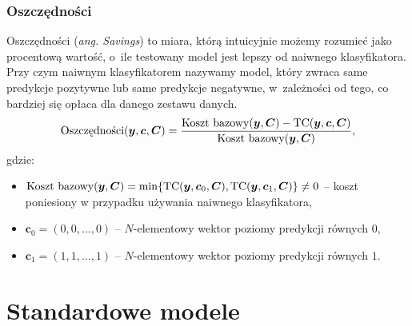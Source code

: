 \documentclass[inzynierska]{pwr_wmat_praca_dyplomowa}
\theoremstyle{plain}
\numberwithin{theorem}{chapter}
\theoremstyle{definition}
\numberwithin{theorem}{chapter}
\begin{document}
\subsubsection{Oszczędności}
Oszczędności (\textit{ang. Savings}) to miara, którą intuicyjnie możemy rozumieć jako procentową wartość, o~ile testowany model jest lepszy od naiwnego klasyfikatora. Przy czym naiwnym klasyfikatorem nazywamy model, który zwraca same predykcje pozytywne lub same predykcje negatywne, w~zależności od tego, co bardziej się opłaca dla danego zestawu danych.
\begin{equation}
	\label{oszczednosci}
	\text{Oszczędności}(\boldsymbol{y}, \boldsymbol{c}, \boldsymbol{C}) = \frac{\text{Koszt bazowy}(\boldsymbol{y}, \boldsymbol{C}) - \text{TC}(\boldsymbol{y}, \boldsymbol{c}, \boldsymbol{C})}{\text{Koszt bazowy}(\boldsymbol{y}, \boldsymbol{C})} \text{,}
\end{equation}
gdzie:
\begin{itemize}
	\item $ \text{Koszt bazowy}(\boldsymbol{y}, \boldsymbol{C}) = \min\{\text{TC}(\boldsymbol{y}, \boldsymbol{c}_0, \boldsymbol{C}), \text{TC}(\boldsymbol{y}, \boldsymbol{c}_1, \boldsymbol{C})\} \neq 0$ -- koszt poniesiony w przypadku używania naiwnego klasyfikatora,
	\item $\boldsymbol{c}_0 = (0, 0, \dots, 0)$ -- $N$-elementowy wektor poziomy predykcji równych $0$,
	\item $\boldsymbol{c}_1 = (1, 1, \dots, 1)$ -- $N$-elementowy wektor poziomy predykcji równych $1$.
\end{itemize}{}

\section{Standardowe modele}
\end{document}
